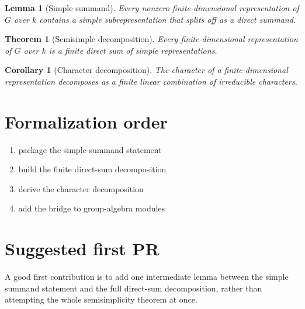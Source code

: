 \documentclass[11pt]{article}
\newtheorem{lemma}[definition]{Lemma}
\newtheorem{theorem}[definition]{Theorem}
\newtheorem{corollary}[definition]{Corollary}
\begin{document}
\begin{lemma}[Simple summand]\label{lem:simple-summand}
Every nonzero finite-dimensional representation of $G$ over $k$ contains a
simple subrepresentation that splits off as a direct summand.
\end{lemma}

\begin{theorem}[Semisimple decomposition]
\label{thm:semisimple-decomposition}
Every finite-dimensional representation of $G$ over $k$ is a finite direct sum
of simple representations.
\end{theorem}

\begin{corollary}[Character decomposition]\label{cor:character-decomposition}
The character of a finite-dimensional representation decomposes as a finite
linear combination of irreducible characters.
\end{corollary}

\section{Formalization order}

\begin{enumerate}
\item package the simple-summand statement
\item build the finite direct-sum decomposition
\item derive the character decomposition
\item add the bridge to group-algebra modules
\end{enumerate}

\section{Suggested first PR}

A good first contribution is to add one intermediate lemma between the simple
summand statement and the full direct-sum decomposition, rather than attempting
the whole semisimplicity theorem at once.
\end{document}
